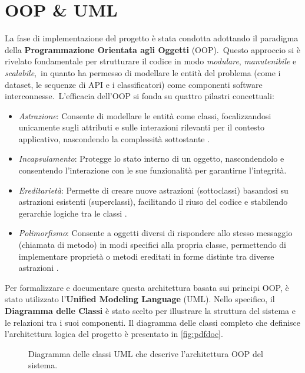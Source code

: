 \section{OOP \& UML}

La fase di implementazione del progetto è stata condotta adottando il paradigma della \textbf{Programmazione Orientata agli Oggetti} (OOP).\
Questo approccio si è rivelato fondamentale per strutturare il codice in modo \textit{modulare}, \textit{manutenibile} e \textit{scalabile},\
in quanto ha permesso di modellare le entità del problema (come i dataset, le sequenze di API e i classificatori) come componenti software interconnesse.\
L'efficacia dell'OOP si fonda su quattro pilastri concettuali:
\begin{itemize}
    \item \textit{Astrazione}: Consente di modellare le entità come classi, focalizzandosi unicamente sugli attributi e sulle interazioni rilevanti per il contesto applicativo,
          nascondendo la complessità sottostante .
    \item \textit{Incapsulamento}: Protegge lo stato interno di un oggetto, nascondendolo e consentendo l'interazione con le sue funzionalità per garantirne l'integrità.
    \item \textit{Ereditarietà}: Permette di creare nuove astrazioni (sottoclassi) basandosi su astrazioni esistenti (superclassi),
          facilitando il riuso del codice e stabilendo gerarchie logiche tra le classi .
    \item \textit{Polimorfismo}: Consente a oggetti diversi di rispondere allo stesso messaggio (chiamata di metodo) in modi specifici alla propria classe,
          permettendo di implementare proprietà o metodi ereditati in forme distinte tra diverse astrazioni \mycite{oop}.
\end{itemize}

Per formalizzare e documentare questa architettura basata sui principi OOP, è stato utilizzato l'\textbf{Unified Modeling Language} (UML).
Nello specifico, il \textbf{Diagramma delle Classi} è stato scelto per illustrare la struttura del sistema e le relazioni tra i suoi componenti.
Il diagramma delle classi completo che definisce l'architettura logica del progetto è presentato in \autoref{fig:pdfdoc}.

\begin{figure}[htbp] %
    \centering
    \adjustbox{max width=\linewidth, max height=\textheight}{%
    }
    \caption{Diagramma delle classi UML che descrive l'architettura OOP del sistema.}
    \label{fig:pdfdoc}
\end{figure}

